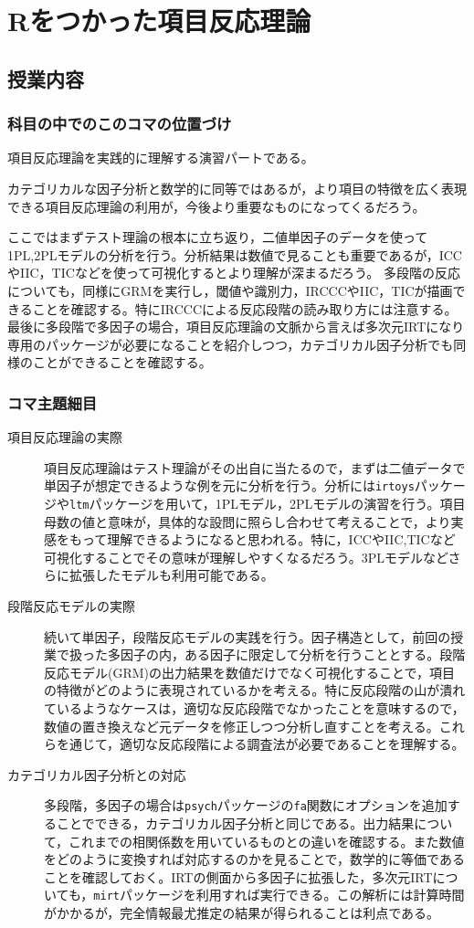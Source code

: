 \section{Rをつかった項目反応理論}
\subsection{授業内容}
\subsubsection{科目の中でのこのコマの位置づけ}
項目反応理論を実践的に理解する演習パートである。

カテゴリカルな因子分析と数学的に同等ではあるが，より項目の特徴を広く表現できる項目反応理論の利用が，今後より重要なものになってくるだろう。

ここではまずテスト理論の根本に立ち返り，二値単因子のデータを使って1PL,2PLモデルの分析を行う。分析結果は数値で見ることも重要であるが，ICCやIIC，TICなどを使って可視化するとより理解が深まるだろう。
多段階の反応についても，同様にGRMを実行し，閾値や識別力，IRCCCやIIC，TICが描画できることを確認する。特にIRCCCによる反応段階の読み取り方には注意する。
最後に多段階で多因子の場合，項目反応理論の文脈から言えば多次元IRTになり専用のパッケージが必要になることを紹介しつつ，カテゴリカル因子分析でも同様のことができることを確認する。
\subsubsection{コマ主題細目}
\begin{description}
    \item[項目反応理論の実際]項目反応理論はテスト理論がその出自に当たるので，まずは二値データで単因子が想定できるような例を元に分析を行う。分析には\texttt{irtoys}パッケージや\texttt{ltm}パッケージを用いて，1PLモデル，2PLモデルの演習を行う。項目母数の値と意味が，具体的な設問に照らし合わせて考えることで，より実感をもって理解できるようになると思われる。特に，ICCやIIC,TICなど可視化することでその意味が理解しやすくなるだろう。3PLモデルなどさらに拡張したモデルも利用可能である。
     
    \item[段階反応モデルの実際] 続いて単因子，段階反応モデルの実践を行う。因子構造として，前回の授業で扱った多因子の内，ある因子に限定して分析を行うこととする。段階反応モデル(GRM)の出力結果を数値だけでなく可視化することで，項目の特徴がどのように表現されているかを考える。特に反応段階の山が潰れているようなケースは，適切な反応段階でなかったことを意味するので，数値の置き換えなど元データを修正しつつ分析し直すことを考える。これらを通じて，適切な反応段階による調査法が必要であることを理解する。

    \item[カテゴリカル因子分析との対応] 多段階，多因子の場合は\texttt{psych}パッケージの\texttt{fa}関数にオプションを追加することでできる，カテゴリカル因子分析と同じである。出力結果について，これまでの相関係数を用いているものとの違いを確認する。また数値をどのように変換すれば対応するのかを見ることで，数学的に等価であることを確認しておく。IRTの側面から多因子に拡張した，多次元IRTについても，\texttt{mirt}パッケージを利用すれば実行できる。この解析には計算時間がかかるが，完全情報最尤推定の結果が得られることは利点である。
\end{description}

